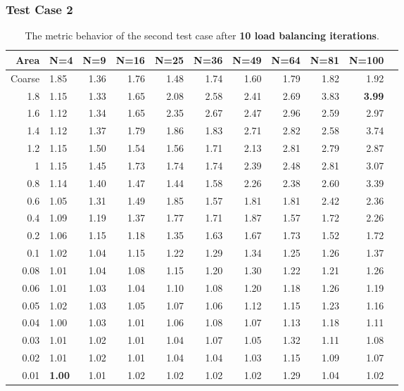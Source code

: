 \documentclass[compress]{beamer}
\begin{document}
\begin{frame}[t]\frametitle{Test Case 2}
\begin{table}[H]
\centering
\tiny
\caption{The metric behavior of the second test case after \textbf{10 load balancing iterations}.} 
\begin{tabular}{rlrrrrrrrrr}
  \hline
 Area & N=4 & N=9 & N=16 & N=25 & N=36 & N=49 & N=64 & N=81 & N=100 \\ 
  \hline
 Coarse & 1.85 & 1.36 & 1.76 & 1.48 & 1.74 & 1.60 & 1.79 & 1.82 & 1.92 \\ 
   1.8 & 1.15 & 1.33 & 1.65 & 2.08 & 2.58 & 2.41 & 2.69 & 3.83 & \textbf{\cellcolor{blue!25}3.99} \\ 
 1.6 & 1.12 & 1.34 & 1.65 & 2.35 & 2.67 & 2.47 & 2.96 & 2.59 & 2.97 \\ 
1.4 & 1.12 & 1.37 & 1.79 & 1.86 & 1.83 & 2.71 & 2.82 & 2.58 & 3.74 \\ 
 1.2 & 1.15 & 1.50 & 1.54 & 1.56 & 1.71 & 2.13 & 2.81 & 2.79 & 2.87 \\ 
 1 & 1.15 & 1.45 & 1.73 & 1.74 & 1.74 & 2.39 & 2.48 & 2.81 & 3.07 \\ 
0.8 & 1.14 & 1.40 & 1.47 & 1.44 & 1.58 & 2.26 & 2.38 & 2.60 & 3.39 \\ 
 0.6 & 1.05 & 1.31 & 1.49 & 1.85 & 1.57 & 1.81 & 1.81 & 2.42 & 2.36 \\ 
 0.4 & 1.09 & 1.19 & 1.37 & 1.77 & 1.71 & 1.87 & 1.57 & 1.72 & 2.26 \\ 
 0.2 & 1.06 & 1.15 & 1.18 & 1.35 & 1.63 & 1.67 & 1.73 & 1.52 & 1.72 \\ 
 0.1 & 1.02 & 1.04 & 1.15 & 1.22 & 1.29 & 1.34 & 1.25 & 1.26 & 1.37 \\ 
   0.08 & 1.01 & 1.04 & 1.08 & 1.15 & 1.20 & 1.30 & 1.22 & 1.21 & 1.26 \\ 
0.06 & 1.01 & 1.03 & 1.04 & 1.10 & 1.08 & 1.20 & 1.18 & 1.26 & 1.19 \\ 
   0.05 & 1.02 & 1.03 & 1.05 & 1.07 & 1.06 & 1.12 & 1.15 & 1.23 & 1.16 \\ 
  0.04 & 1.00 & 1.03 & 1.01 & 1.06 & 1.08 & 1.07 & 1.13 & 1.18 & 1.11 \\ 
 0.03 & 1.01 & 1.02 & 1.01 & 1.04 & 1.07 & 1.05 & 1.32 & 1.11 & 1.08 \\ 
  0.02 & 1.01 & 1.02 & 1.01 & 1.04 & 1.04 & 1.03 & 1.15 & 1.09 & 1.07 \\ 
 0.01 & \textbf{\cellcolor{blue!25}1.00} & 1.01 & 1.02 & 1.02 & 1.02 & 1.02 & 1.29 & 1.04 & 1.02 \\ 
   \hline
\end{tabular}
\end{table}
\end{frame}
\end{document}
